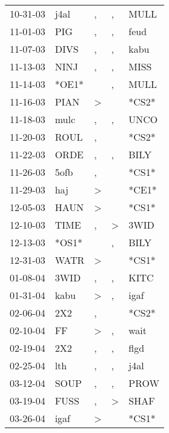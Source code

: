 \begin{supertabular}{lllll}
 10-31-03 &   j4al &                , &                , &   MULL \\
 11-01-03 &    PIG &                , &                , &   feud \\
 11-07-03 &   DIVS &                , &                , &   kabu \\
 11-13-03 &   NINJ &                , &                , &   MISS \\
 11-14-03 &  *OE1* &                  &                , &   MULL \\
 11-16-03 &   PIAN &     \textgreater &                  &  *CS2* \\
 11-18-03 &   mulc &                , &                , &   UNCO \\
 11-20-03 &   ROUL &                , &                  &  *CS2* \\
 11-22-03 &   ORDE &                , &                , &   BILY \\
 11-26-03 &   5ofb &                , &                  &  *CS1* \\
 11-29-03 &    haj &     \textgreater &                  &  *CE1* \\
 12-05-03 &   HAUN &     \textgreater &                  &  *CS1* \\
 12-10-03 &   TIME &                , &     \textgreater &   3WID \\
 12-13-03 &  *OS1* &                  &                , &   BILY \\
 12-31-03 &   WATR &     \textgreater &                  &  *CS1* \\
 01-08-04 &   3WID &                , &                , &   KITC \\
 01-31-04 &   kabu &     \textgreater &                , &   igaf \\
 02-06-04 &    2X2 &                , &                  &  *CS2* \\
 02-10-04 &     FF &     \textgreater &                , &   wait \\
 02-19-04 &    2X2 &                , &                , &   flgd \\
 02-25-04 &    lth &                , &                , &   j4al \\
 03-12-04 &   SOUP &                , &                , &   PROW \\
 03-19-04 &   FUSS &                , &     \textgreater &   SHAF \\
 03-26-04 &   igaf &     \textgreater &                  &  *CS1* \\

\end{supertabular}
